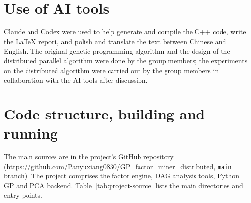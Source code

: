 \documentclass[11pt,a4paper]{article}
\newcommand{\code}[1]{\texttt{#1}}
\begin{document}
\section*{Use of AI tools}
Claude and Codex were used to help generate and compile the C++ code, write the \LaTeX{} report, and polish and translate the text between Chinese and English. The original genetic-programming algorithm and the design of the distributed parallel algorithm were done by the group members; the experiments on the distributed algorithm were carried out by the group members in collaboration with the AI tools after discussion.
\clearpage

\appendix
\section{Code structure, building and running}
The main sources are in the project's \href{https://github.com/Panyuxiang0830/GP_factor_miner_distributed}{GitHub repository} (\url{https://github.com/Panyuxiang0830/GP_factor_miner_distributed}, \code{main} branch). The project comprises the factor engine, DAG analysis tools, Python GP and PCA backend. Table~\ref{tab:project-source} lists the main directories and entry points.
\end{document}
